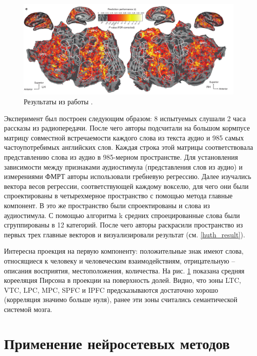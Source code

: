 \documentclass[pdftex,ptm,12pt,a4paper]{report}
\theoremstyle{definition}
\begin{document}
\begin{figure}[h]
\includegraphics[scale=0.4]{images/map_result_huth.png}
\centering
\caption{Результаты из работы \cite{huth2016natural}.}
\label{map_huth_result}
\end{figure}

Эксперимент был построен следующим образом: 8 испытуемых слушали 2 часа рассказы из радиопередачи. После чего авторы подсчитали на большом кормпусе матрицу совместной встречаемости каждого слова из текста аудио и 985 самых частоупотребимых английских слов. Каждая строка этой матрицы соответствовала представлению слова из аудио в 985-мерном пространстве. Для установления зависимости между признаками аудиостимула (представления слов из аудио) и измерениями ФМРТ авторы использовали гребневую регрессию. Далее изучались вектора весов регрессии, соответствующей каждому вокселю, для чего они были спроектированы в четырехмерное пространство с помощью метода главные компонент. В это же пространство были спроектированы и слова из аудиостимула. С помощью алгоритма k средних спроецированные слова были сгруппированы в 12 категорий. После чего авторы раскрасили пространство из первых трех главные векторов и визуализировали результат (см. \ref{huth_result}). 

Интересна проекция на первую компоненту: положительные знак имеют слова, относящиеся к человеку и человеческим взаимодействиям, отрицательную -- описания восприятия, местоположения, количества. На рис. \ref{map_huth_result} показана средняя корееляция Пирсона в проекции на поверхность долей. Видно, что зоны LTC, VTC, LPC, MPC, SPFC и IPFC предсказываются достаточно хорошо (корреляция значимо больше нуля), ранее эти зоны считались семантической системой мозга.


\section{Применение нейросетевых методов}
\end{document}
